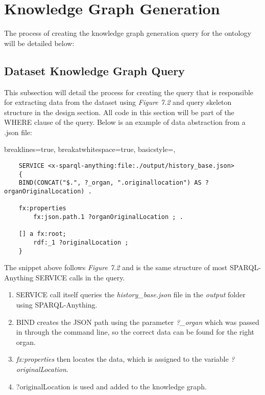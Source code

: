 \section{Knowledge Graph Generation}
\hspace*{0.5cm} The process of creating the knowledge graph generation query for the ontology will be detailed below:

\subsection{Dataset Knowledge Graph Query}
\hspace*{0.5cm} This subsection will detail the process for creating the query that is responsible for extracting data from the dataset using \textit{Figure 7.2} and query skeleton structure in the design section. All code in this section will be part of the WHERE clause of the query. Below is an example of data abstraction from a .json file:

\lstset
{
    breaklines=true,
    breakatwhitespace=true,
    basicstyle=\ttfamily,
}
\begin{lstlisting}
    SERVICE <x-sparql-anything:file:./output/history_base.json> 
    {
    BIND(CONCAT("$.", ?_organ, ".originallocation") AS ?organOriginalLocation) .

    fx:properties
        fx:json.path.1 ?organOriginalLocation ; .

    [] a fx:root; 
        rdf:_1 ?originalLocation ;
    } 
\end{lstlisting}

The snippet above follows \textit{Figure 7.2} and is the same structure of most SPARQL-Anything SERVICE calls in the query. 

\begin{enumerate}
    \item SERVICE call itself queries the \textit{history\_base.json} file in the \textit{output} folder using SPARQL-Anything. 
    \item BIND creates the JSON path using the parameter \textit{?\_organ} which was passed in through the command line, so the correct data can be found for the right organ. 
    \item \textit{fx:properties} then locates the data, which is assigned to the variable \textit{?originalLocation}. 
    \item ?originalLocation is used and added to the knowledge graph.
\end{enumerate}

